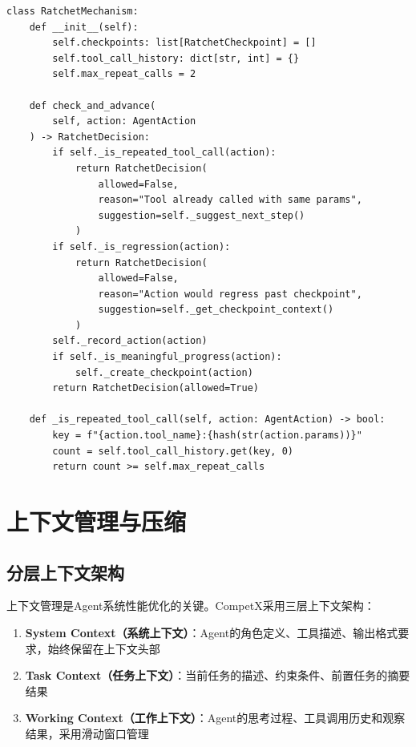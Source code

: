 \documentclass[12pt,a4paper]{ctexrep}
\begin{document}
\begin{lstlisting}[language=Python3,caption=Ratchet机制核心实现,label=lst:ratchet]
class RatchetMechanism:
    def __init__(self):
        self.checkpoints: list[RatchetCheckpoint] = []
        self.tool_call_history: dict[str, int] = {}
        self.max_repeat_calls = 2

    def check_and_advance(
        self, action: AgentAction
    ) -> RatchetDecision:
        if self._is_repeated_tool_call(action):
            return RatchetDecision(
                allowed=False,
                reason="Tool already called with same params",
                suggestion=self._suggest_next_step()
            )
        if self._is_regression(action):
            return RatchetDecision(
                allowed=False,
                reason="Action would regress past checkpoint",
                suggestion=self._get_checkpoint_context()
            )
        self._record_action(action)
        if self._is_meaningful_progress(action):
            self._create_checkpoint(action)
        return RatchetDecision(allowed=True)

    def _is_repeated_tool_call(self, action: AgentAction) -> bool:
        key = f"{action.tool_name}:{hash(str(action.params))}"
        count = self.tool_call_history.get(key, 0)
        return count >= self.max_repeat_calls
\end{lstlisting}

\section{上下文管理与压缩}

\subsection{分层上下文架构}

上下文管理是Agent系统性能优化的关键。CompetX采用三层上下文架构：

\begin{enumerate}[leftmargin=2em]
\item \textbf{System Context（系统上下文）}：Agent的角色定义、工具描述、输出格式要求，始终保留在上下文头部
\item \textbf{Task Context（任务上下文）}：当前任务的描述、约束条件、前置任务的摘要结果
\item \textbf{Working Context（工作上下文）}：Agent的思考过程、工具调用历史和观察结果，采用滑动窗口管理
\end{enumerate}
\end{document}
